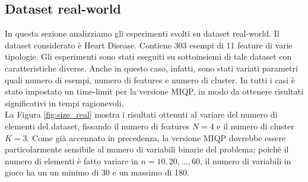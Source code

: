 \documentclass{article}
\begin{document}
    \subsection{Dataset real-world}
    In questa sezione analizziamo gli esperimenti svolti su dataset real-world. Il dataset considerato è Heart Disease. Contiene 303 esempi di 11 feature di varie tipologie.
    Gli esperimenti sono stati eseguiti su sottoinsiemi di tale dataset con caratteristiche diverse. Anche in questo caso, infatti, sono stati variati parametri quali numero di esempi, numero di features e numero di cluster. In tutti i casi è stato impostato un time-limit per la versione MIQP, in modo da ottenere risultati significativi in tempi ragionevoli.\\
    La Figura \ref{fig:size_real} mostra i risultati ottenuti al variare del numero di elementi del dataset, fissando il numero di features $N=4$ e il numero di cluster $K=3$. Come già accennato in precedenza, la versione MIQP dovrebbe essere particolarmente sensibile al numero di variabili binarie del problema; poiché il numero di elementi è fatto variare in $n=10,20,...,60$, il numero di variabili in gioco ha un un minimo di 30 e un massimo di 180.\\
\end{document}
